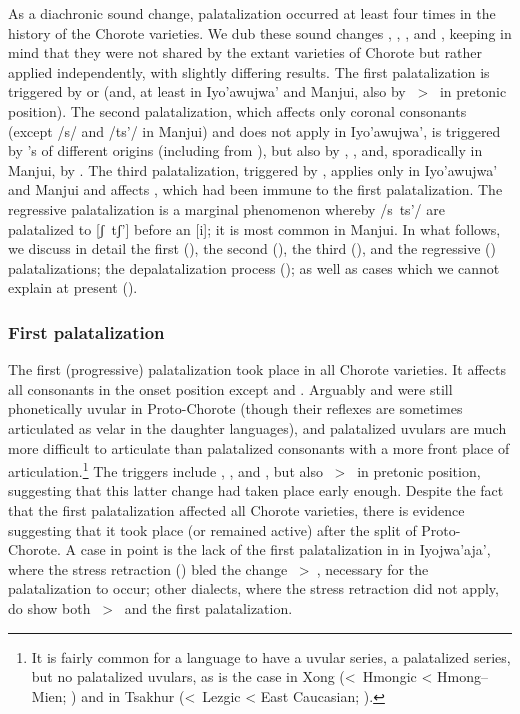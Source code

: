 As a diachronic sound change, palatalization occurred at least four times in the history of the Chorote varieties. We dub these sound changes , , , and , keeping in mind that they were not shared by the extant varieties of Chorote but rather applied independently, with slightly differing results. The first palatalization is triggered by  or  (and, at least in Iyo’awujwa’ and Manjui, also by ~>~ in pretonic position). The second palatalization, which affects only coronal consonants (except /s/ and /ts'/ in Manjui) and does not apply in Iyo’awujwa’, is triggered by 's of different origins (including from ), but also by , , and, sporadically in Manjui, by . The third palatalization, triggered by , applies only in Iyo'awujwa' and Manjui and affects , which had been immune to the first palatalization. The regressive palatalization is a marginal phenomenon whereby /s~ts’/ are palatalized to [ʃ~tʃ’] before an [i]; it is most common in Manjui. In what follows, we discuss in detail the first (), the second (), the third (), and the regressive () palatalizations; the depalatalization process (); as well as cases which we cannot explain at present ().

\subsubsection{First palatalization}\label{ch-pal1}

The first (progressive) palatalization took place in all Chorote varieties. It affects all consonants in the onset position except  and . Arguably  and  were still phonetically uvular in Proto-Chorote (though their reflexes are sometimes articulated as velar in the daughter languages), and palatalized uvulars are much more difficult to articulate than palatalized consonants with a more front place of articulation.\footnote{It is fairly common for a language to have a uvular series, a palatalized series, but no palatalized uvulars, as is the case in Xong (<~Hmongic < Hmong--Mien; ) and in Tsakhur (<~Lezgic < East Caucasian; ).} The triggers include , , and , but also ~>~ in pretonic position, suggesting that this latter change had taken place early enough. 
Despite the fact that the first palatalization affected all Chorote varieties, there is evidence suggesting that it took place (or remained active) after the split of Proto-Chorote. A case in point is the lack of the first palatalization in  in Iyojwa'aja', where the stress retraction () bled the change ~>~, necessary for the palatalization to occur; other dialects, where the stress retraction did not apply, do show both ~>~ and the first palatalization.

